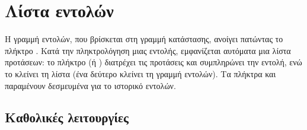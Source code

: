 \documentclass[letterpaper,10pt,greek]{sphinxmanual}
\begin{document}
\sphinxstepscope


\section{Λίστα εντολών}
\label{\detokenize{cmd_mode:liste-des-commandes}}\label{\detokenize{cmd_mode:cmd-mode}}\label{\detokenize{cmd_mode::doc}}
\sphinxAtStartPar
Η γραμμή εντολών, που βρίσκεται στη γραμμή κατάστασης, ανοίγει πατώντας το πλήκτρο . Κατά την πληκτρολόγηση μιας εντολής, εμφανίζεται αυτόματα μια λίστα προτάσεων: το πλήκτρο  (ή ) διατρέχει τις προτάσεις και συμπληρώνει την εντολή, ενώ το  κλείνει τη λίστα (ένα δεύτερο  κλείνει τη γραμμή εντολών). Τα πλήκτρα  και  παραμένουν δεσμευμένα για το ιστορικό εντολών.


\subsection{Καθολικές λειτουργίες}
\label{\detokenize{cmd_mode:operations-globales}}\label{\detokenize{cmd_mode:cmd-global}}
\end{document}
